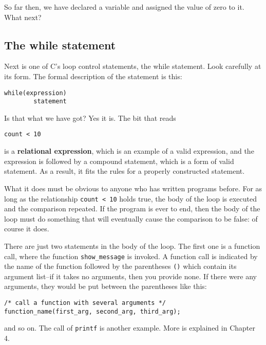    So far then, we have declared a variable and assigned the value of zero
    to it. What next?


  

  \subsection{The while statement}
   

   Next is one of C's loop control statements, the while statement. Look
    carefully at its form. The formal description of the \while{}
    statement is this:


   \begin{Verbatim}
while(expression)
        statement
\end{Verbatim}

   Is that what we have got? Yes it is. The bit that reads


   \begin{Verbatim}
count < 10
\end{Verbatim}

   is a \textbf{relational expression}, which is an example of a valid
    expression, and the expression is followed by a compound statement, which
    is a form of valid statement. As a result, it fits the rules for a properly
    constructed \while{} statement.


   What it does must be obvious to anyone who has written programs
    before. For as long as the relationship \texttt{count < 10} holds
    true, the body of the loop is executed and the comparison repeated. If the
    program is ever to end, then the body of the loop must do something that
    will eventually cause the comparison to be false: of course it does.


   There are just two statements in the body of the loop. The first one is a
    function call, where the function \texttt{show\_message} is invoked. A
    function call is indicated by the name of the function followed by the
    parentheses \texttt{()} which contain its argument list--if it
    takes no arguments, then you provide none. If there were any arguments,
    they would be put between the parentheses like this:


   \begin{Verbatim}
/* call a function with several arguments */
function_name(first_arg, second_arg, third_arg);
\end{Verbatim}

   and so on. The call of \texttt{printf} is another example. More is
    explained in Chapter 4.


